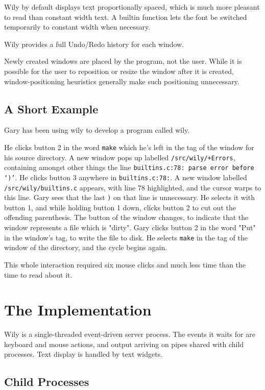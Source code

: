 \documentclass[twocolumn]{article}
\begin{document}
Wily by default displays text proportionally spaced, which is much more pleasant
to read than constant width text.  A builtin function lets the font be
switched temporarily to constant
width when necessary.

Wily provides a full Undo/Redo history for each window.

Newly created windows are placed by the program, not the user.
While it is possible for the user to reposition or resize the window after
it is created, window-positioning heuristics generally make
such positioning unnecessary.

	\subsection{A Short Example}

Gary has been using wily to develop a program called wily.

He clicks button 2 in the word \texttt{make} which he's left in the
tag of the window for his source directory.  A new window
pops up labelled \texttt{/src/wily/+Errors}, containing
amongst other things the line \texttt{builtins.c:78: parse error before `)'}.
He clicks button 3 anywhere in \texttt{builtins.c:78:}.  A new window
labelled \texttt{/src/wily/builtins.c} appears, with line 78 highlighted,
and the cursor warps to this line.
Gary sees that the last \texttt{)} on that line is unnecessary.  He
selects it with button 1, and while holding button 1 down, clicks button
2 to cut out the offending parenthesis.  The button of the window
changes, to indicate that the window represents a file which is "dirty".
Gary clicks button 2 in the word "Put" in the window's tag, to write
the file to disk.  He selects \texttt{make} in the tag of the window
of the directory, and the cycle begins again.

This whole interaction required six mouse clicks and much less
time than the time to read about it.

\section{The Implementation}

Wily is a single-threaded event-driven server process.  The events it
waits for are keyboard and mouse actions, and output arriving
on pipes shared with child processes.  Text display is handled
by text widgets.

	\subsection{Child Processes}
\end{document}
